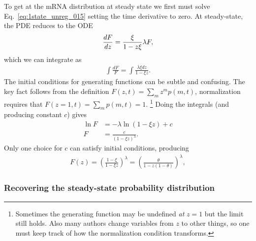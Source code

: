 To get at the mRNA distribution at steady state we first must solve
Eq.~\ref{eq:1state_unreg_015} setting the time derivative to zero. At
steady-state, the PDE reduces to the ODE
\begin{align}
\deriv[F]{z} = \frac{\xi}{1-z\xi}\lambda F,
\end{align}
which we can integrate as
\begin{align}
\int \frac{dF}{F} = \int \frac{\lambda\xi dz}{1-\xi z}.
\end{align}
The initial conditions for generating functions can be subtle and confusing. The
key fact follows from the definition
$F(z,t) = \sum_m z^m p(m,t)$,
normalization requires that
$F(z=1, t) = \sum_m p(m,t) = 1$.
\footnote{
Sometimes the generating function may be undefined \textit{at} $z=1$ but the
limit still holds. Also many authors change variables from $z$ to other
things, so one must keep track of how the normalization condition transforms.
}
Doing the integrals (and producing constant $c$) gives
\begin{align}
\ln F &= -\lambda \ln(1-\xi z) + c
\\
F &= \frac{c}{(1-\xi z)^\lambda}.
\end{align}
Only one choice for $c$ can satisfy initial conditions, producing
\begin{align}
F(z) = \left(\frac{1-\xi}{1-\xi z}\right)^\lambda
        = \left(\frac{\theta}{1 - z(1-\theta)}\right)^\lambda,
\label{eq:gen_fn}
\end{align}

\subsubsection{Recovering the steady-state probability distribution}

